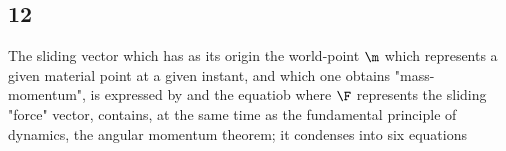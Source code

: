\subsection*{12}
The sliding vector which has as its origin the world-point $\m$ which represents a given material point at a given instant, and which one obtains  "mass-momentum", is expressed by
and the equatiob
where $\F$ represents the sliding "force" vector, contains, at the same time as the fundamental principle of dynamics, the angular momentum theorem; it condenses into six equations
